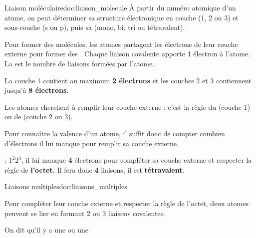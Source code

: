 \begin{doc}{Liaison moléculaire}{doc:liaison_molecule}
  À partir du numéro atomique d'un atome, on peut déterminer sa structure électronique en couche (1, 2 ou 3) et sous-couche (s ou p), puis sa  (mono, bi, tri ou tétravalent).
  \begin{encart}
    Pour former des molécules, les atomes partagent les électrons de leur couche externe pour former des .
    Chaque liaison covalente apporte 1 électron à l'atome.
    La  est le nombre de liaisons formées par l'atome.
  \end{encart}
  \begin{encart}
    La couche 1 contient au maximum \textbf{2 électrons} et les couches 2 et 3 contiennent jusqu'à \textbf{8 électrons}.

    Les atomes cherchent à remplir leur couche externe : c'est la règle du  (couche 1) ou de  (couche 2 ou 3).
  \end{encart}
  Pour connaître la valence d'un atome, il suffit donc de compter combien d'électrons il lui manque pour remplir sa couche externe.

  \exemple {} : $1^2 2^4$,
  il lui manque \textbf{4} électrons pour compléter sa couche externe et respecter la règle de \textbf{l'octet.}
  Il fera donc \textbf{4} liaisons, il est \textbf{tétravalent}.
\end{doc}



%


\begin{doc}{Liaisons multiples}{doc:liaisons_multiples}
  \begin{encart}
    Pour compléter leur couche externe et respecter la règle de l'octet, deux atomes peuvent se lier en formant 2 ou 3 liaisons covalentes.
    
    On dit qu'il y a une  ou une 
  \end{encart}
\end{doc}


